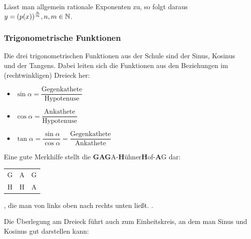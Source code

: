 \documentclass[ngerman, 12pt]{nssheetxea}
\begin{document}
Lässt man allgemein rationale Exponenten zu, so folgt daraus $y=\mleft( p(x) \mright) ^{\frac{n}{m}}, n,m \in \N$. 

\subsubsection{Trigonometrische Funktionen}
Die drei trigonometrischen Funktionen aus der Schule sind der Sinus, Kosinus und der Tangens. Dabei leiten sich die Funktionen aus den Beziehungen im (rechtwinkligen) Dreieck her:
\begin{itemize}
\item $\sin \alpha = \dfrac{\mathrm{Gegenkathete}}{\mathrm{Hypotenuse}}$
\item $\cos \alpha = \dfrac{\mathrm{Ankathete}}{\mathrm{Hypotenuse}}$
\item $\tan \alpha = \dfrac{\sin \alpha}{\cos \alpha} = \dfrac{\mathrm{Gegenkathete}}{\mathrm{Ankathete}}$
  
\end{itemize}
Eine gute Merkhilfe stellt die \textbf{GAG}A-\textbf{H}ühner\textbf{H}of-\textbf{A}G dar:
\begin{tabular}{c c c}
G & A & G \\
H & H & A
\end{tabular}, die man von links oben nach rechts unten ließt. .\par
Die Überlegung am Dreieck führt auch zum Einheitskreis, an dem man Sinus und Kosinus gut darstellen kann:
\begin{center}
\end{center}
\end{document}
